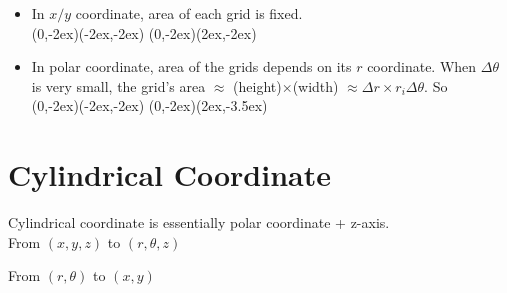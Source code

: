 \documentclass[class=article, crop=false, 12pt]{standalone}
\begin{document}
\begin{itemize}
    \item In $x/y$ coordinate, area of each grid is fixed.
    \\
    {(0,-2ex)}{(-2ex,-2ex)}
    {(0,-2ex)}{(2ex,-2ex)}


    \item In polar coordinate, area of the grids depends on its $r$ coordinate.
    When $\Delta \theta$ is very small, the grid's area $\approx$ (height)$\times$(width) $\approx \Delta r\times r_i\Delta \theta$. So
    \\
    {(0,-2ex)}{(-2ex,-2ex)}
    {(0,-2ex)}{(2ex,-3.5ex)}


\end{itemize}


\linesep
\section{Cylindrical Coordinate}

Cylindrical coordinate is essentially polar coordinate + z-axis.\\

From $(x,y,z)$ to $(r,\theta,z)$

From $(r,\theta)$ to $(x,y)$
\end{document}

